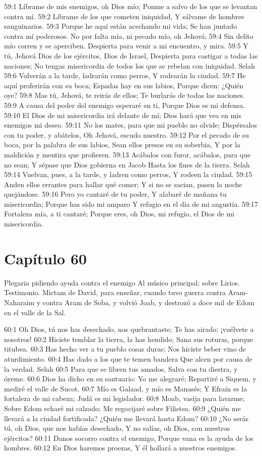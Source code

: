 59:1 Líbrame de mis enemigos, oh Dios mío; 
Ponme a salvo de los que se levantan contra mí. 
59:2 Líbrame de los que cometen iniquidad, 
Y sálvame de hombres sanguinarios. 
59:3 Porque he aquí están acechando mi vida; 
Se han juntado contra mí poderosos. 
No por falta mía, ni pecado mío, oh Jehová; 
59:4 Sin delito mío corren y se aperciben. 
Despierta para venir a mi encuentro, y mira. 
59:5 Y tú, Jehová Dios de los ejércitos, Dios de Israel, 
Despierta para castigar a todas las naciones; 
No tengas misericordia de todos los que se rebelan con iniquidad. Selah 
59:6 Volverán a la tarde, ladrarán como perros, 
Y rodearán la ciudad. 
59:7 He aquí proferirán con su boca; 
Espadas hay en sus labios, 
Porque dicen: ¿Quién oye? 
59:8 Mas tú, Jehová, te reirás de ellos; 
Te burlarás de todas las naciones. 
59:9 A causa del poder del enemigo esperaré en ti, 
Porque Dios es mi defensa. 
59:10 El Dios de mi misericordia irá delante de mí; 
Dios hará que vea en mis enemigos mi deseo. 
59:11 No los mates, para que mi pueblo no olvide; 
Dispérsalos con tu poder, y abátelos, 
Oh Jehová, escudo nuestro. 
59:12 Por el pecado de su boca, por la palabra de sus labios, 
Sean ellos presos en su soberbia, 
Y por la maldición y mentira que profieren. 
59:13 Acábalos con furor, acábalos, para que no sean; 
Y sépase que Dios gobierna en Jacob 
Hasta los fines de la tierra. Selah 
59:14 Vuelvan, pues, a la tarde, y ladren como perros, 
Y rodeen la ciudad. 
59:15 Anden ellos errantes para hallar qué comer; 
Y si no se sacian, pasen la noche quejándose. 
59:16 Pero yo cantaré de tu poder, 
Y alabaré de mañana tu misericordia; 
Porque has sido mi amparo 
Y refugio en el día de mi angustia. 
59:17 Fortaleza mía, a ti cantaré; 
Porque eres, oh Dios, mi refugio, el Dios de mi misericordia. 
\section*{Capítulo 60}
Plegaria pidiendo ayuda contra el enemigo 
Al músico principal; sobre Lirios. Testimonio. Mictam de David, para enseñar, cuando tuvo guerra contra Aram-Naharaim y contra Aram de Soba, y volvió Joab, y destrozó a doce mil de Edom en el valle de la Sal. 
 
60:1 Oh Dios, tú nos has desechado, nos quebrantaste; 
Te has airado; ¡vuélvete a nosotros! 
60:2 Hiciste temblar la tierra, la has hendido; 
Sana sus roturas, porque titubea. 
60:3 Has hecho ver a tu pueblo cosas duras; 
Nos hiciste beber vino de aturdimiento. 
60:4 Has dado a los que te temen bandera 
Que alcen por causa de la verdad. Selah 
60:5 Para que se libren tus amados, 
Salva con tu diestra, y óyeme. 
60:6 Dios ha dicho en su santuario: Yo me alegraré; 
Repartiré a Siquem, y mediré el valle de Sucot. 
60:7 Mío es Galaad, y mío es Manasés; 
Y Efraín es la fortaleza de mi cabeza; 
Judá es mi legislador. 
60:8 Moab, vasija para lavarme; 
Sobre Edom echaré mi calzado; 
Me regocijaré sobre Filistea. 
60:9 ¿Quién me llevará a la ciudad fortificada? 
¿Quién me llevará hasta Edom? 
60:10 ¿No serás tú, oh Dios, que nos habías desechado, 
Y no salías, oh Dios, con nuestros ejércitos? 
60:11 Danos socorro contra el enemigo, 
Porque vana es la ayuda de los hombres. 
60:12 En Dios haremos proezas, 
Y él hollará a nuestros enemigos. 
